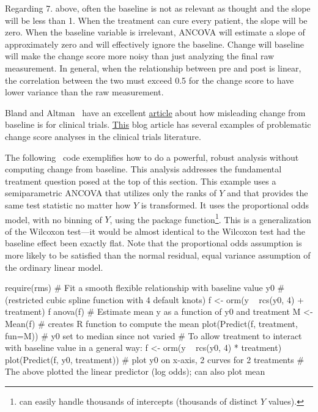 Regarding 7. above, often the baseline is not as relevant as thought and the slope will be less than 1.  When the treatment can cure every patient, the slope will be zero.  When the baseline variable is irrelevant, ANCOVA will estimate a slope of approximately zero and will effectively ignore the baseline.  Change will baseline will make the change score more noisy than just analyzing the final raw measurement.  In general, when the relationship between pre and post is linear, the correlation between the two must exceed 0.5 for the change score to have lower variance than the raw measurement.

Bland and Altman~\cite{bla11com} have an excellent \href{https://www.ncbi.nlm.nih.gov/pmc/articles/PMC3286439}{article} about how misleading change from baseline is for clinical trials.  \href{http://www.fharrell.com/2017/04/statistical-errors-in-medical-literature.html#change}{This} blog article has several examples of problematic change score analyses in the clinical trials literature.

The following \R\ code exemplifies how to do a powerful, robust analysis without computing change from baseline.  This analysis addresses the fundamental treatment question posed at the top of this section.  This example uses a semiparametric ANCOVA that utilizes only the ranks of $Y$ and that provides the same test statistic no matter how $Y$ is transformed.  It uses the proportional odds model, with no binning of $Y$, using the  package  function\footnote{ can easily handle thousands of intercepts (thousands of distinct $Y$ values).}.  This is a generalization of the Wilcoxon test---it would be almost identical to the Wilcoxon test had the baseline effect been exactly flat.  Note that the proportional odds assumption is more likely to be satisfied than the normal residual, equal variance assumption of the ordinary linear model.

\begin{Schunk}
\begin{Sinput}
require(rms)
# Fit a smooth flexible relationship with baseline value y0
# (restricted cubic spline function with 4 default knots)
f <- orm(y ~ rcs(y0, 4) + treatment)
f
anova(f)
# Estimate mean y as a function of y0 and treatment
M <- Mean(f)   # creates R function to compute the mean
plot(Predict(f, treatment, fun=M))  # y0 set to median since not varied
# To allow treatment to interact with baseline value in a general way:
f <- orm(y ~ rcs(y0, 4) * treatment)
plot(Predict(f, y0, treatment))  # plot y0 on x-axis, 2 curves for 2 treatments
# The above plotted the linear predictor (log odds); can also plot mean
\end{Sinput}
\end{Schunk}

